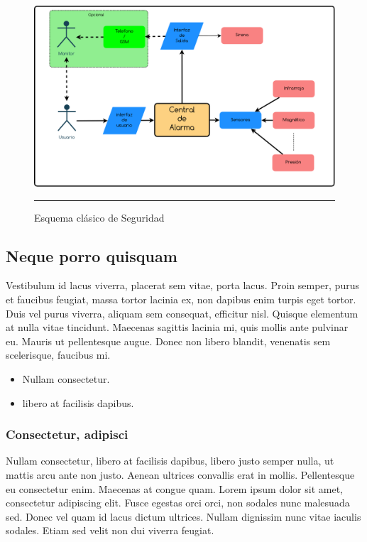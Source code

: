 \begin{figure}[htbp]
	\centering
		\includegraphics[width=1\textwidth]{Figures/Diagrama_clasico.png}
		\rule{35em}{1pt}
	\caption[Esquema clásico de Seguridad]{Esquema clásico de Seguridad}
	\label{fig:Diagrama_clasico}
\end{figure}

\newpage
\subsection{Neque porro quisquam}
Vestibulum id lacus viverra, placerat sem vitae, porta lacus. Proin semper, purus et faucibus feugiat, massa tortor lacinia ex, non dapibus enim turpis eget tortor. Duis vel purus viverra, aliquam sem consequat, efficitur nisl. Quisque elementum at nulla vitae tincidunt. Maecenas sagittis lacinia mi, quis mollis ante pulvinar eu. Mauris ut pellentesque augue. Donec non libero blandit, venenatis sem scelerisque, faucibus mi.

\begin{itemize}
\item Nullam consectetur.
\item libero at facilisis dapibus.
\end{itemize}

\subsubsection{Consectetur, adipisci}
Nullam consectetur, libero at facilisis dapibus, libero justo semper nulla, ut mattis arcu ante non justo. Aenean ultrices convallis erat in mollis. Pellentesque eu consectetur enim. Maecenas at congue quam. Lorem ipsum dolor sit amet, consectetur adipiscing elit. Fusce egestas orci orci, non sodales nunc malesuada sed. Donec vel quam id lacus dictum ultrices. Nullam dignissim nunc vitae iaculis sodales. Etiam sed velit non dui viverra feugiat.
